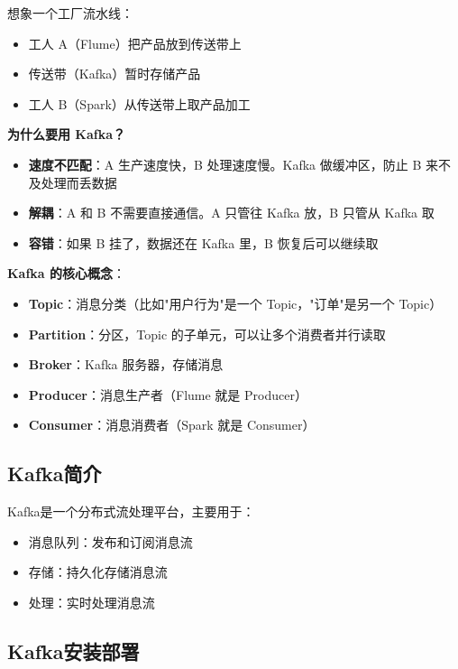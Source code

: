 \documentclass[12pt,a4paper]{article}
\begin{document}
\begin{theorybox}
想象一个工厂流水线：
\begin{itemize}
    \item 工人 A（Flume）把产品放到传送带上
    \item 传送带（Kafka）暂时存储产品
    \item 工人 B（Spark）从传送带上取产品加工
\end{itemize}

\textbf{为什么要用 Kafka？}
\begin{itemize}
    \item \textbf{速度不匹配}：A 生产速度快，B 处理速度慢。Kafka 做缓冲区，防止 B 来不及处理而丢数据
    \item \textbf{解耦}：A 和 B 不需要直接通信。A 只管往 Kafka 放，B 只管从 Kafka 取
    \item \textbf{容错}：如果 B 挂了，数据还在 Kafka 里，B 恢复后可以继续取
\end{itemize}

\textbf{Kafka 的核心概念}：
\begin{itemize}
    \item \textbf{Topic}：消息分类（比如"用户行为"是一个 Topic，"订单"是另一个 Topic）
    \item \textbf{Partition}：分区，Topic 的子单元，可以让多个消费者并行读取
    \item \textbf{Broker}：Kafka 服务器，存储消息
    \item \textbf{Producer}：消息生产者（Flume 就是 Producer）
    \item \textbf{Consumer}：消息消费者（Spark 就是 Consumer）
\end{itemize}
\end{theorybox}

\subsection{Kafka简介}

\begin{theorybox}[Kafka作用]
Kafka是一个分布式流处理平台，主要用于：
\begin{itemize}
    \item 消息队列：发布和订阅消息流
    \item 存储：持久化存储消息流
    \item 处理：实时处理消息流
\end{itemize}
\end{theorybox}

\subsection{Kafka安装部署}
\end{document}
